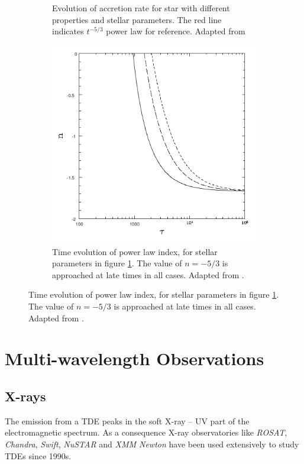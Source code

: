 \documentclass{tda}
\begin{document}
\begin{figure}
\begin{subfigure} {.33\linewidth}
		\caption{Evolution of accretion rate for star with different properties and stellar parameters. The red line indicates \(t^{-5/3}\) power law for reference. Adapted from \cite{lodato_stellar_2009}}
		\label{fig:lodato2009a}
	\end{subfigure}
	\begin{subfigure} {.33\linewidth}
		\centering
		\captionsetup{width=.85\linewidth}
		\includegraphics[width=\textwidth]{./images/lodato2009b.png}
		\caption{Time evolution of power law index, for stellar parameters in figure \ref{fig:lodato2009a}. The value of \(n=-5/3\) is approached at late times in all cases. Adapted from \cite{lodato_stellar_2009}.}
	\end{subfigure}
\end{figure}

\section{Multi-wavelength Observations} \label{multiwavelength_astro}


\subsection{X-rays} \label{multiwave:xrays}

The emission from a TDE peaks in the soft X-ray -- UV part of the electromagnetic spectrum. As a consequence X-ray observatories like \textit{ROSAT}, \textit{Chandra}, \textit{Swift}, \textit{NuSTAR} and \textit{XMM Newton} have been used extensively to study TDEs since 1990s.
\end{document}
